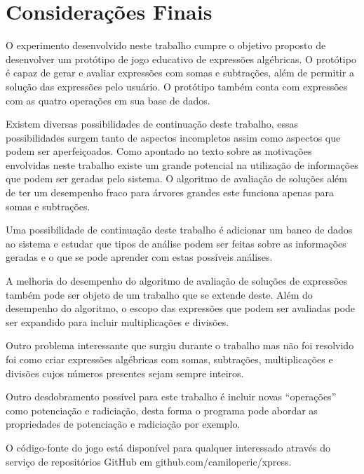 \part{Considerações Finais}
O experimento desenvolvido neste trabalho cumpre o objetivo proposto de desenvolver um protótipo de jogo educativo de expressões algébricas. O protótipo é capaz de gerar e avaliar expressões com somas e subtrações, além de permitir a solução das expressões pelo usuário. O protótipo também conta com expressões com as quatro operações em sua base de dados.

Existem diversas possibilidades de continuação deste trabalho, essas possibilidades surgem tanto de aspectos incompletos assim como aspectos que podem ser aperfeiçoados. Como apontado no texto sobre as motivações envolvidas neste trabalho existe um grande potencial na utilização de informações que podem ser geradas pelo sistema. O algoritmo de avaliação de soluções além de ter um desempenho fraco para árvores grandes este funciona apenas para somas e subtrações.

Uma possibilidade de continuação deste trabalho é adicionar um banco de dados ao sistema e estudar que tipos de análise podem ser feitas sobre as informações geradas e o que se pode aprender com estas possíveis análises.

A melhoria do desempenho do algoritmo de avaliação de soluções de expressões também pode ser objeto de um trabalho que se extende deste. Além do desempenho do algoritmo, o escopo das expressões que podem ser avaliadas pode ser expandido para incluir multiplicações e divisões.

Outro problema interessante que surgiu durante o trabalho mas não foi resolvido foi como criar expressões algébricas com somas, subtrações, multiplicações e divisões cujos números presentes sejam sempre inteiros.

Outro desdobramento possível para este trabalho é incluir novas “operações” como potenciação e radiciação, desta forma o programa pode abordar as propriedades de potenciação e radiciação por exemplo.

O código-fonte do jogo está disponível para qualquer interessado através do serviço de repositórios GitHub em github.com/camiloperic/xpress.
